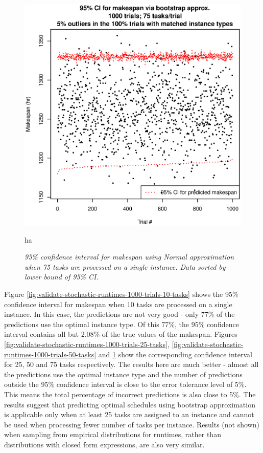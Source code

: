 \documentclass[12pt]{report}
\begin{document}
\begin{figure}
\includegraphics[width=1\textwidth]{validate-stochastic-runtimes-1000-trials-75-tasks.eps}
\caption{\textit{95\% confidence interval for makespan using Normal approximation when 75 tasks are processed on a single instance. Data sorted by lower bound of 95\% CI.}}ha
\label{fig:validate-stochastic-runtimes-1000-trials-75-tasks}
\end{figure}

Figure \ref{fig:validate-stochastic-runtimes-1000-trials-10-tasks} shows the 95\% confidence interval for makespan when 10 tasks are processed on a single instance. 
In this case, the predictions are not very good - only 77\% of the predictions use the optimal instance type.
Of this 77\%, the 95\% confidence interval contains all but 2.08\% of the true values of the makespan.
Figures \ref{fig:validate-stochastic-runtimes-1000-trials-25-tasks}, \ref{fig:validate-stochastic-runtimes-1000-trials-50-tasks} and \ref{fig:validate-stochastic-runtimes-1000-trials-75-tasks} show the corresponding confidence interval for 25, 50 and 75 tasks respectively. 
The results here are much better - almost all the predictions use the optimal instance type and the number of predictions outside the 95\% confidence interval is close to the error tolerance level of 5\%.
This means the total percentage of incorrect predictions is also close to 5\%.
The results suggest that predicting optimal schedules using bootstrap approximation is applicable only when at least 25 tasks are assigned to an instance and cannot be used when processing fewer number of tasks per instance.
Results (not shown) when sampling from empirical distributions for runtimes, rather than distributions with closed form expressions, are also very similar.
\end{document}
